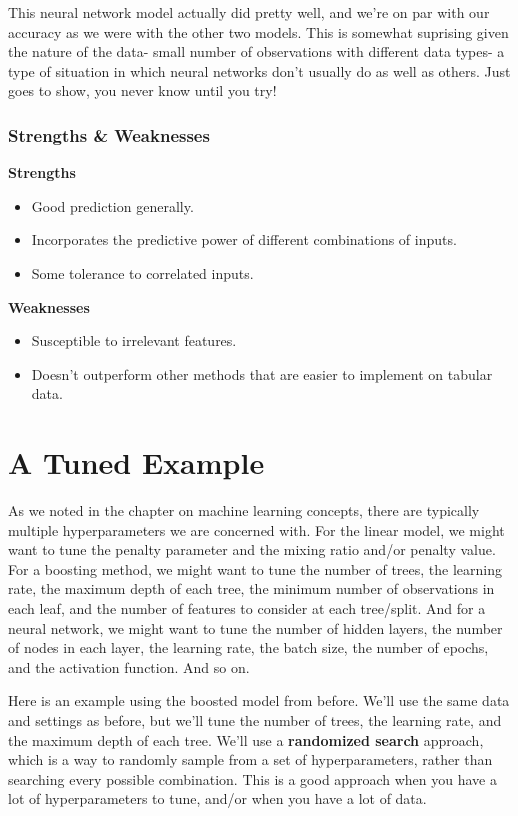 \documentclass[
  letterpaper,
]{krantz}
\providecommand{\tightlist}{%
  \setlength{\itemsep}{0pt}\setlength{\parskip}{0pt}}\usepackage{longtable,booktabs,array}
\begin{document}
This neural network model actually did pretty well, and we're on par
with our accuracy as we were with the other two models. This is somewhat
suprising given the nature of the data- small number of observations
with different data types- a type of situation in which neural networks
don't usually do as well as others. Just goes to show, you never know
until you try!

\subsubsection{Strengths \& Weaknesses}\label{strengths-weaknesses-2}

\textbf{Strengths}

\begin{itemize}
\tightlist
\item
  Good prediction generally.
\item
  Incorporates the predictive power of different combinations of inputs.
\item
  Some tolerance to correlated inputs.
\end{itemize}

\textbf{Weaknesses}

\begin{itemize}
\tightlist
\item
  Susceptible to irrelevant features.
\item
  Doesn't outperform other methods that are easier to implement on
  tabular data.
\end{itemize}

\section{A Tuned Example}\label{a-tuned-example}

As we noted in the chapter on machine learning concepts, there are
typically multiple hyperparameters we are concerned with. For the linear
model, we might want to tune the penalty parameter and the mixing ratio
and/or penalty value. For a boosting method, we might want to tune the
number of trees, the learning rate, the maximum depth of each tree, the
minimum number of observations in each leaf, and the number of features
to consider at each tree/split. And for a neural network, we might want
to tune the number of hidden layers, the number of nodes in each layer,
the learning rate, the batch size, the number of epochs, and the
activation function. And so on.

Here is an example using the boosted model from before. We'll use the
same data and settings as before, but we'll tune the number of trees,
the learning rate, and the maximum depth of each tree. We'll use a
\textbf{randomized search} approach, which is a way to randomly sample
from a set of hyperparameters, rather than searching every possible
combination. This is a good approach when you have a lot of
hyperparameters to tune, and/or when you have a lot of data.
\end{document}
